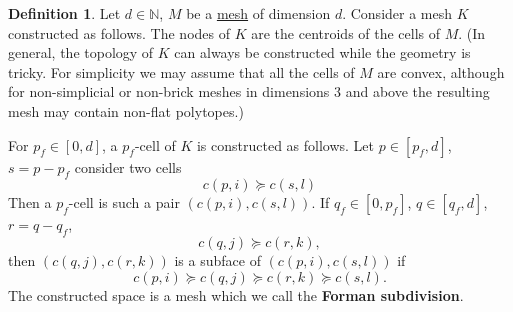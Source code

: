 \documentclass[fleqn]{article}
\theoremstyle{definition}
\newtheorem{definition}[theorem]{Definition}
\newcommand{\N}{\mathbb{N}}
\begin{document}
\begin{definition}
  Let
    $d \in \N$,
    $M$ be a \hyperref[idec:mesh:definition]{mesh} of dimension $d$.
  Consider a mesh $K$ constructed as follows.
  The nodes of $K$ are the centroids of the cells of $M$.
  (In general, the topology of $K$ can always be constructed while the geometry
  is tricky.
  For simplicity we may assume that all the cells of $M$ are convex,
  although for non-simplicial or non-brick meshes in dimensions $3$ and above
  the resulting mesh may contain non-flat polytopes.)

  For $p_f \in [0, d]$, a $p_f$-cell of $K$ is constructed as follows.
  Let $p \in [p_f, d]$, $s = p - p_f$ consider two cells
  \begin{equation}
    c(p, i) \succeq c(s, l)
  \end{equation}
  Then a $p_f$-cell is such a pair $(c(p, i), c(s, l))$.
  If $q_f \in [0, p_f]$, $q \in [q_f, d]$, $r = q - q_f$,
  \begin{equation}
    c(q, j) \succeq c(r, k),
  \end{equation}
  then $(c(q, j), c(r, k))$ is a subface of $(c(p, i), c(s, l))$ if
  \begin{equation}
    c(p, i) \succeq c(q, j) \succeq c(r, k) \succeq c(s, l).
  \end{equation}
  The constructed space is a mesh which we call the \textbf{Forman subdivision}.
\end{definition}
\end{document}
